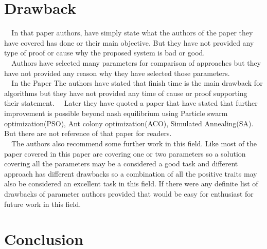 \documentclass[10pt]{report}
\begin{document}
\chapter{Drawback}
\verb|  |In that paper authors, have simply state what the authors of the paper they have covered has done or their main objective. But they have not provided any type of proof or cause why the proposed system is bad or good.\\
\verb|  |Authors have selected many parameters for comparison of approaches but they have not provided any reason why they have selected those parameters.\\
\verb|  |In the Paper The authors have stated that finish time is the main drawback for algorithms but they have not provided any time of cause or proof supporting their statement. 
\verb|  |Later they have quoted a paper that have stated that further improvement is possible beyond nash equilibrium using Particle swarm optimization(PSO), Ant colony optimization(ACO), Simulated Annealing(SA). But there are not reference of that paper for readers. \\
\verb|  |The authors also recommend some further work in this field. Like most of the paper covered in this paper are covering one or two parameters so a solution covering all the parameters may be a considered a good task and different approach has different drawbacks so a combination of all the positive traits may also be considered an excellent task in this field. If there were any definite list of drawbacks of parameter authors provided that would be easy for enthusiast for future work in this field.
\chapter{Conclusion}



\end{document}
